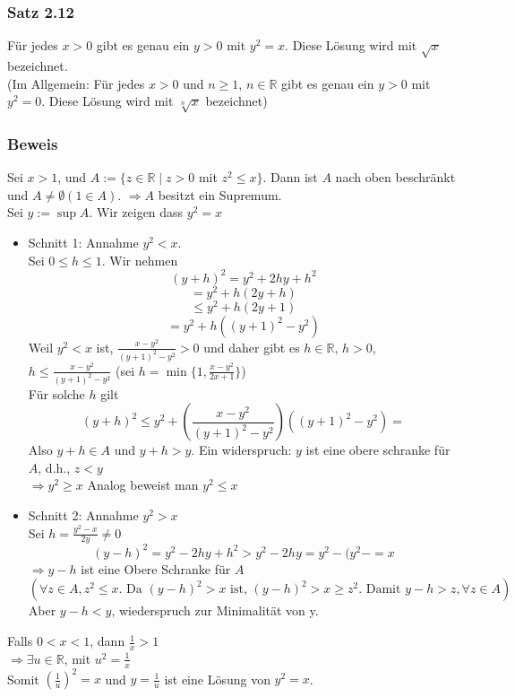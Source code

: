 \subsubsection*{Satz 2.12}
Für jedes $x>0$ gibt es genau ein $y>0$ mit $y^2=x$. Diese Lösung wird mit $\sqrt{x}$ bezeichnet.\\

(Im Allgemein: Für jedes $x>0$ und $n\geq 1$, $n\in\mathbb{R}$ gibt es genau ein $y>0$ mit $y^2=0$. Diese Lösung wird mit $\sqrt[n]{x}$ bezeichnet)
\subsubsection*{Beweis}
Sei $x>1$, und $A:=\{ z\in\mathbb{R}\mid z>0$ mit $z^2\leq x\}$. Dann ist $A$ nach oben beschränkt und $A\not=\emptyset (1\in A)$. $\Rightarrow A$ besitzt ein Supremum. \\
Sei $y:=\sup A$. Wir zeigen dass $y^2=x$
\begin{itemize}
    \item Schnitt 1: Annahme $y^2<x$. \\ 
    Sei $0\leq h\leq 1$.  Wir nehmen \[\left( y+h\right)^2=y^2+2hy+h^2\]
    \[=y^2+h(2y+h)\]
    \[\leq y^2+h(2y+1)\]
    \[=y^2 +h\left( (y+1)^2 -y^2\right)\]
    Weil $y^2<x$ ist, $\frac{x-y^2}{(y+1)^2-y^2}>0$ und daher gibt es $h\in\mathbb{R}$, $h>0$, $h\leq\frac{x-y^2}{(y+1)^2-y^2}$ (sei $h=\min \{1,\frac{x-y^2}{2x+1}\}$)\\
    
    Für solche $h$ gilt \[(y+h)^2\leq y^2 + \left( \frac{x-y^2}{(y+1)^2-y^2}\right)\left( (y+1)^2 -y^2\right)=\] Also $y+h\in A$ und $y+h>y$. Ein widerspruch: $y$ ist eine obere schranke für $A$, d.h., $z<y$\\$\Rightarrow y^2\geq x$ Analog beweist man $y^2\leq x$
    \item Schnitt 2: Annahme $y^2>x$\\
    Sei $h=\frac{y^2-x}{2y}\not=0$ 
    \[(y-h)^2=y^2-2hy+h^2>y^2-2hy=y^2 -(y^2-=x\]
    $\Rightarrow y-h$ ist eine Obere Schranke für $A$
    \[\left( \forall z \in A, z^2\leq x\text{. Da }(y-h)^2>x \text{ ist, } (y-h)^2>x\geq z^2\text{. Damit } y-h>z, \forall z \in A\right)\]
    Aber $y-h<y$, wiederspruch zur Minimalität von y.
\end{itemize}
Falls $0<x<1$, dann $\frac{1}{x}>1$\\
$\Rightarrow \exists u\in\mathbb{R}$, mit $u^2=\frac{1}{x}$\\
Somit $\left( \frac{1}{u}\right)^2=x$ und $y=\frac{1}{u}$ ist eine Lösung von $y^2=x$.\\

